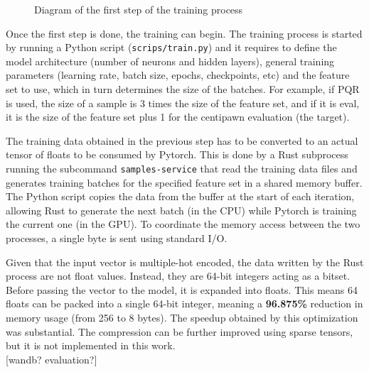 \begin{figure}[h]
\centering
{}
\caption{Diagram of the first step of the training process}
\label{fig:database_to_train_data}
\end{figure}


Once the first step is done, the training can begin. The training process is started by running a Python script (\texttt{scrips/train.py}) and it requires to define the model architecture (number of neurons and hidden layers), general training parameters (learning rate, batch size, epochs, checkpoints, etc) and the feature set to use, which in turn determines the size of the batches. For example, if PQR is used, the size of a sample is 3 times the size of the feature set, and if it is eval, it is the size of the feature set plus 1 for the centipawn evaluation (the target).

The training data obtained in the previous step has to be converted to an actual tensor of floats to be consumed by Pytorch. This is done by a Rust subprocess running the subcommand \texttt{samples-service} that read the training data files and generates training batches for the specified feature set in a shared memory buffer. The Python script copies the data from the buffer at the start of each iteration, allowing Rust to generate the next batch (in the CPU) while Pytorch is training the current one (in the GPU). To coordinate the memory access between the two processes, a single byte is sent using standard I/O.

Given that the input vector is multiple-hot encoded, the data written by the Rust process are not float values. Instead, they are 64-bit integers acting as a bitset. Before passing the vector to the model, it is expanded into floats. This means 64 floats can be packed into a single 64-bit integer, meaning a \textbf{96.875\%} reduction in memory usage (from 256 to 8 bytes). The speedup obtained by this optimization was substantial. The compression can be further improved using sparse tensors, but it is not implemented in this work. \\

[wandb? evaluation?]


